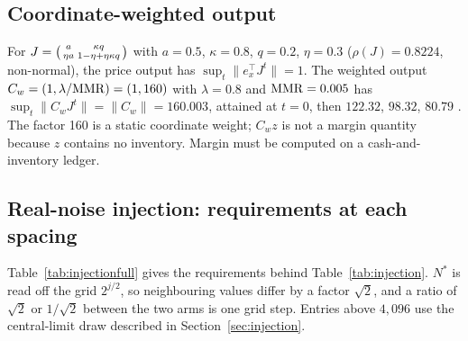 \documentclass[12pt]{article}
\theoremstyle{definition}
\theoremstyle{remark}
\newcommand{\lab}[1]{}
\begin{document}
\subsection{Coordinate-weighted output}\label{app:coordw}
For $J=\begin{psmallmatrix}a&\kappa q\\ \eta a&1-\eta+\eta\kappa q\end{psmallmatrix}$ with $a=0.5$, $\kappa=0.8$, $q=0.2$, $\eta=0.3$ ($\rho(J)=0.8224$, non-normal), the price output has $\sup_t\|e_x^\top J^t\|=1$. The weighted output $C_w=(1,\lambda/{\rm MMR})=(1,160)$ with $\lambda=0.8$ and ${\rm MMR}=0.005$ has $\sup_t\|C_wJ^t\|=\|C_w\|=160.003$, attained at $t=0$, then $122.32$, $98.32$, $80.79$ \lab{recomputed in closed form}. The factor 160 is a static coordinate weight; $C_wz$ is not a margin quantity because $z$ contains no inventory. Margin must be computed on a cash-and-inventory ledger.

\subsection{Real-noise injection: requirements at each spacing}\label{app:injection}

Table~\ref{tab:injectionfull} gives the requirements behind Table~\ref{tab:injection}. $N^*$ is read off the grid $2^{j/2}$, so neighbouring values differ by a factor $\sqrt2$, and a ratio of $\sqrt2$ or $1/\sqrt2$ between the two arms is one grid step. Entries above $4{,}096$ use the central-limit draw described in Section~\ref{sec:injection}.
\end{document}
